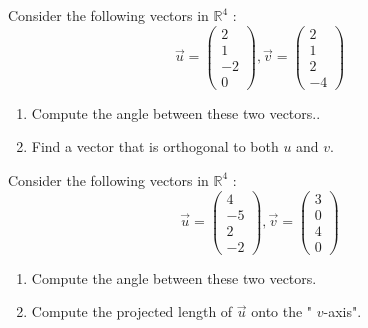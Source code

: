 \documentclass[12pt]{amsart}
\begin{document}
\begin{problem}
Consider the following vectors in $\mathbb{R}^4$ :
$$
\vec{u}=\left(\begin{array}{c}
2 \\
1 \\
-2 \\
0
\end{array}\right), 
\vec{v}=\left(\begin{array}{c}
2 \\
1 \\
2 \\
-4
\end{array}\right)
$$
\begin{enumerate}
    \item  Compute the angle between these two vectors..
    \item Find a vector that is orthogonal to both $u$ and $v$.
\end{enumerate}
\end{problem}

\begin{problem}
 Consider the following vectors in $\mathbb{R}^4$ :
$$
\vec{u}=\left(\begin{array}{c}
4 \\
-5 \\
2 \\
-2
\end{array}\right), 
\vec{v}=\left(\begin{array}{l}
3 \\
0 \\
4 \\
0
\end{array}\right)
$$
\begin{enumerate}
    \item Compute the angle between these two vectors.
    \item Compute the projected length of $\vec{u}$ onto the " $v$-axis".
\end{enumerate}
\end{problem}
\end{document}
